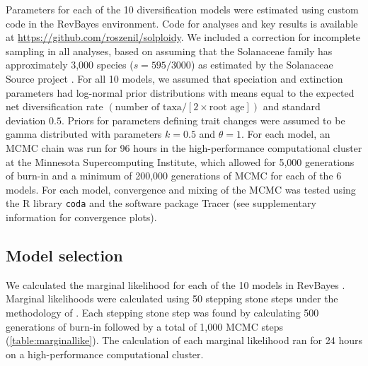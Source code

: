 Parameters for each of the 10 diversification models were estimated using custom code in the RevBayes \citep{hoehna_2016} environment.
Code for analyses and key results is available at \url{https://github.com/roszenil/solploidy}.
We included a correction for incomplete sampling in all analyses, based on assuming that the Solanaceae family has approximately 3,000 species ($s=595/3000$) as estimated by the Solanaceae Source project \citep{solsource}.
For all 10 models, we assumed that speciation and extinction parameters had log-normal prior distributions with means equal to the expected net diversification rate $(\text{number of taxa} / [2 \times \text{root age}])$ and standard deviation $0.5$.
Priors for parameters defining trait changes were assumed to be gamma distributed with parameters $k=0.5$ and $\theta=1$. 
For each model, an MCMC chain was run for 96 hours in the high-performance computational cluster at the Minnesota Supercomputing Institute, which allowed for 5,000 generations of burn-in and a minimum of 200,000 generations of MCMC for each of the 6 models. %
For each model, convergence and mixing of the MCMC was tested using the R library \texttt{coda} and the software package Tracer (see supplementary information for convergence plots). %


\subsection{Model selection}

We calculated the marginal likelihood for each of the 10 models in RevBayes \citep{hoehna_2016}.
Marginal likelihoods were calculated using 50 stepping stone steps under the methodology of \citet{xie_2010}.
Each stepping stone step was found by calculating 500 generations of burn-in followed by a total of 1,000 MCMC steps (\cref{table:marginallike}).
The calculation of each marginal likelihood ran for 24 hours on a high-performance computational cluster.

